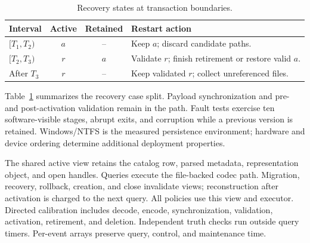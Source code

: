 \begin{table}[t]
\centering\small
\caption{Recovery states at transaction boundaries.}
\label{tab:invariants}
\begin{tabularx}{\columnwidth}{@{}lccX@{}}\toprule
Interval & Active & Retained & Restart action \\
\midrule
$[T_1,T_2)$ & $a$ & -- & Keep $a$; discard candidate paths. \\
$[T_2,T_3)$ & $r$ & $a$ & Validate $r$; finish retirement or restore valid $a$. \\
After $T_3$ & $r$ & -- & Keep validated $r$; collect unreferenced files. \\
\bottomrule\end{tabularx}
\end{table}

Table~\ref{tab:invariants} summarizes the recovery case split. Payload synchronization and pre- and post-activation validation remain in the path. Fault tests exercise ten software-visible stages, abrupt exits, and corruption while a previous version is retained. Windows/NTFS is the measured persistence environment; hardware and device ordering determine additional deployment properties.

The shared active view retains the catalog row, parsed metadata, representation object, and open handles. Queries execute the file-backed codec path. Migration, recovery, rollback, creation, and close invalidate views; reconstruction after activation is charged to the next query. All policies use this view and executor. Directed calibration includes decode, encode, synchronization, validation, activation, retirement, and deletion. Independent truth checks run outside query timers. Per-event arrays preserve query, control, and maintenance time.
